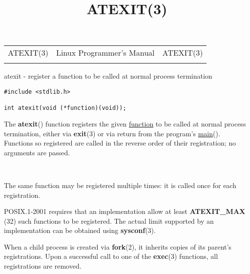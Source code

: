 \documentclass[]{article}
\title{ATEXIT(3)}
\author{}
\date{}
\let\realtextbf=\textbf
\renewcommand{\textbf}[1]{\textcolor{boldcolor}{\realtextbf{#1}}}
\renewcommand{\emph}[1]{\underline{#1}}
\begin{document}
\maketitle

\begin{longtable}[c]{@{}lll@{}}
\toprule\addlinespace
ATEXIT(3) & Linux Programmer's Manual & ATEXIT(3)
\\\addlinespace
\bottomrule
\end{longtable}


atexit - register a function to be called at normal process termination


\begin{verbatim}
#include <stdlib.h>
 
int atexit(void (*function)(void));
\end{verbatim}


The \textbf{atexit}() function registers the given \emph{function} to be
called at normal process termination, either via \textbf{exit}(3) or via
return from the program's \emph{main}(). Functions so registered are
called in the reverse order of their registration; no arguments are
passed.

~

The same function may be registered multiple times: it is called once
for each registration.

POSIX.1-2001 requires that an implementation allow at least
\textbf{ATEXIT\_MAX} (32) such functions to be registered. The actual
limit supported by an implementation can be obtained using
\textbf{sysconf}(3).

When a child process is created via \textbf{fork}(2), it inherits copies
of its parent's registrations. Upon a successful call to one of the
\textbf{exec}(3) functions, all registrations are removed.
\end{document}
